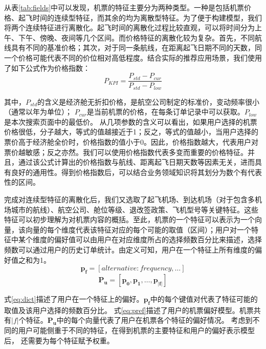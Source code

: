 从表\ref{tab:fields}中可以发现，机票的特征主要分为两种类型。一种是包括机票价格、起飞时间的连续型特征，而其余的均为离散型特征。为了便于构建模型，我们将两个连续特征进行离散化。起飞时间的离散化过程比较直观，可以将时间分为上午、下午、傍晚、夜间等几个区间。而价格特征的离散化较为复杂。首先，不同航线具有不同的基准价格；其次，对于同一条航线，在距离起飞日期不同的天数，同一个价格可能代表不同的价位相对高低程度。结合实际的推荐应用场景，我们使用了如下公式作为价格指数：\\
\begin{equation}
	P_{KPI} = \frac{P_{std} - P_{cur}}{P_{std} - P_{low}}
\end{equation}\par
其中，$P_{std}$的含义是经济舱无折扣价格，是航空公司制定的标准价，变动频率很小（通常以年为单位）；
$P_{cur}$是当前机票的价格，在每条订单记录中可以获取。$P_{low}$是本次搜索页面中的最低价。
从几项参数的含义可以看出，如果用户选择的机票价格很低，分子越大，等式的值越接近于1；反之，等式的值越小，当用户选择的票价高于经济舱全价时，价格指数的值小于0。因此，价格指数越大，代表用户对票价越敏感；反之亦然。我们可以使用价格指数代表多变而重要的价格特征。并且，通过该公式计算出的价格指数与航线、距离起飞日期天数等因素无关，进而具有良好的通用性。得到价格指数后，可以结合业务领域知识将其划分为数个有代表性的区间。\par
完成对连续型特征的离散化后，我们又选取了起飞机场、到达机场（对于包含多机场城市的航线）、航空公司、舱位等级、退改签政策、飞机型号等关键特征。这些特征可以初步理解为对机票内容的概括。至此，机票的一个特征可以表示为一个向量，该向量的每个维度代表该特征对应的每个可能的取值（区间）；用户对一个特征中某个维度的偏好值可以由用户在对应维度所占的选择频数百分比来描述，选择频数可以通过用户的历史订单统计。由定义可知，用户在一个特征上所有维度的偏好值之和为1。\\

\begin{equation}
\label{eq:dict}
	\mathbf{p_f} = [alternative:frequency,\dots]
\end{equation}
\begin{equation}
\label{eq:pref}
	\mathbf{P_u} = [\mathbf{p_0},\mathbf{p_1},\dots,\mathbf{p_{|f|}}]
\end{equation}\par
式\ref{eq:dict}描述了用户在一个特征上的偏好。$\mathbf{p_f}$中的每个键值对代表了特征可能的取值及该用户选择的频数百分比。
式\ref{eq:pref}描述了用户的机票偏好模型。机票共有$|f|$个特征。$\mathbf{P_u}$中的每个向量代表了用户在机票各个特征的偏好情况。
考虑到不同的用户可能侧重于不同的特征，在得到机票的主要特征和用户的偏好表示模型后，
还需要为每个特征赋予权重。

